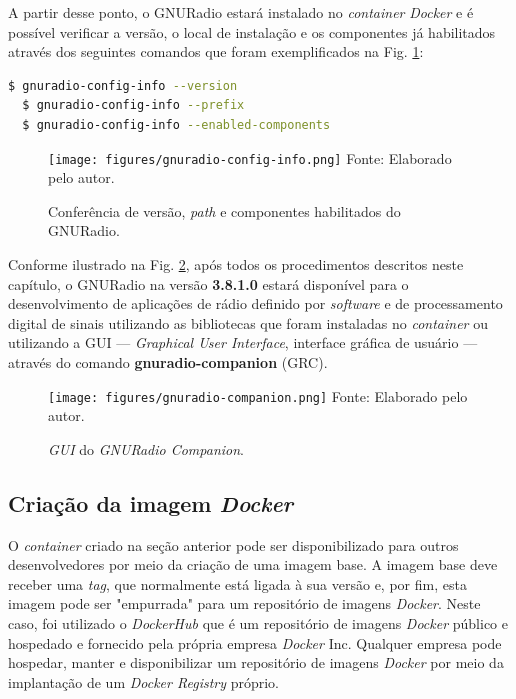\documentclass[
  12pt,				%
  openright,			%
  twoside,			%
  a4paper,			%
  english,			%
  french,				%
  spanish,			%
  brazil,				%
  ]{abntex2}
\begin{document}
A partir desse ponto, o GNURadio estará instalado no \textit{container} \textit{Docker} e é possível verificar a versão, o local de instalação e os
componentes já habilitados através dos seguintes comandos que foram exemplificados na Fig. \ref{fig:gnuradio-config-info}:

\begin{adjustbox}{max width=\linewidth}
  \begin{lstlisting}[language=bash]
  $ gnuradio-config-info --version
  $ gnuradio-config-info --prefix
  $ gnuradio-config-info --enabled-components
\end{lstlisting}
\end{adjustbox}

\begin{figure}[!htb]
  \centering
  \caption{Conferência de versão, \textit{path} e componentes habilitados do GNURadio.}
  \texttt{[image: figures/gnuradio-config-info.png]}
  Fonte: Elaborado pelo autor.
  \label{fig:gnuradio-config-info}
\end{figure}

Conforme ilustrado na Fig. \ref{fig:gnuradio-companion}, após todos os procedimentos descritos neste capítulo, o GNURadio na versão \textbf{3.8.1.0} estará
disponível para o desenvolvimento de aplicações de rádio definido por \textit{software} e de processamento digital de sinais utilizando as bibliotecas
que foram instaladas no \textit{container} ou utilizando a GUI — \textit{Graphical User Interface}, interface gráfica de usuário —
através do comando \textbf{gnuradio-companion} (GRC).

\begin{figure}[!htb]
  \centering
  \caption{\textit{GUI} do \textit{GNURadio Companion}.}
  \texttt{[image: figures/gnuradio-companion.png]}
  Fonte: Elaborado pelo autor.
  \label{fig:gnuradio-companion}
\end{figure}

\subsection*{Criação da imagem \textit{Docker}}

O \textit{container} criado na seção anterior pode ser disponibilizado para outros desenvolvedores por meio da criação de uma imagem
base. A imagem base deve receber uma \textit{tag}, que normalmente está ligada à sua versão e, por fim, esta imagem pode ser
"empurrada" para um repositório de imagens \textit{Docker}. Neste caso, foi utilizado o \textit{DockerHub} que é um repositório
de imagens \textit{Docker} público e hospedado e fornecido pela própria empresa \textit{Docker} Inc. Qualquer empresa pode hospedar, manter
e disponibilizar um repositório de imagens \textit{Docker} por meio da implantação de um \textit{Docker Registry} próprio.
\end{document}
